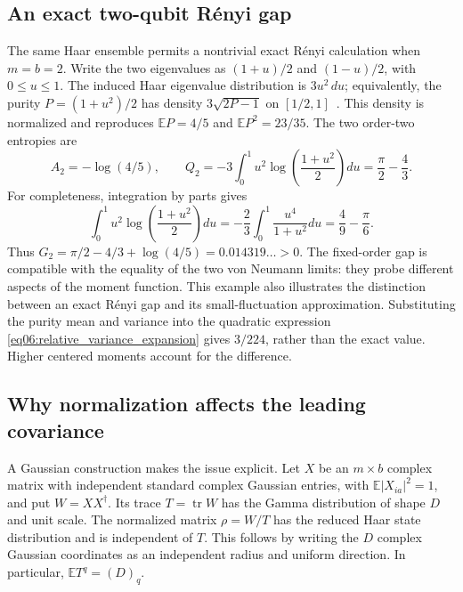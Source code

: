 \documentclass[11pt,letterpaper]{article}
\theoremstyle{plain}
\theoremstyle{definition}
\theoremstyle{remark}
\newcommand{\E}{\mathbb{E}}
\DeclareMathOperator{\tr}{tr}
\begin{document}
\subsection{An exact two-qubit R\'enyi gap}
\label{subsec14:two_qubit_gap}

The same Haar ensemble permits a nontrivial exact R\'enyi calculation
when $m=b=2$.  Write the two eigenvalues as $(1+u)/2$ and $(1-u)/2$,
with $0\leq u\leq1$.  The induced Haar eigenvalue distribution is
$3u^2\,du$; equivalently, the purity $P=(1+u^2)/2$ has density
$3\sqrt{2P-1}$ on $[1/2,1]$~\citep{giraud2007}.  This density is
normalized and reproduces $\E P=4/5$ and $\E P^2=23/35$.
The two order-two entropies are
\begin{equation}
 A_2=-\log(4/5),\qquad
 Q_2=-3\int_0^1u^2\log\!\left(\frac{1+u^2}{2}\right)du
     =\frac{\pi}{2}-\frac43.
 \label{eq14:two_qubit_renyi}
\end{equation}
For completeness, integration by parts gives
\begin{equation}
 \int_0^1u^2\log\!\left(\frac{1+u^2}{2}\right)du
 =-\frac23\int_0^1\frac{u^4}{1+u^2}du
 =\frac49-\frac{\pi}{6}.
 \label{eq14:two_qubit_integral}
\end{equation}
Thus $G_2=\pi/2-4/3+\log(4/5)=0.014319\ldots>0$.
The fixed-order gap is compatible with the equality of the two
von Neumann limits: they probe different aspects of the moment
function.  This example also illustrates the distinction between an
exact R\'enyi gap and its small-fluctuation approximation.  Substituting
the purity mean and variance into the quadratic expression
\eqref{eq06:relative_variance_expansion} gives $3/224$, rather than
the exact value.  Higher centered moments account for the difference.

\subsection{Why normalization affects the leading covariance}
\label{subsec14:normalization}

A Gaussian construction makes the issue explicit.  Let $X$ be an
$m\times b$ complex matrix with independent standard complex Gaussian
entries, with $\E|X_{ia}|^2=1$, and put $W=XX^\dagger$.
Its trace $T=\tr W$ has the Gamma distribution of shape $D$ and unit
scale.  The normalized matrix $\rho=W/T$ has the reduced Haar
state distribution and is independent of $T$.  This follows by writing
the $D$ complex Gaussian coordinates as an independent radius and
uniform direction.  In particular, $\E T^q=(D)_q$.
\end{document}
